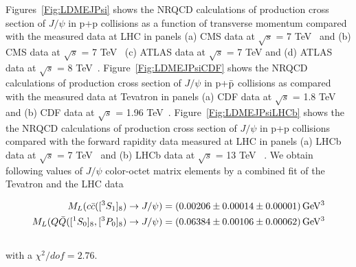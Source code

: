 \documentclass[12pt,a4paper,final]{iopart}
\newcommand{\barQ}{{\bar{Q}}}
\newcommand{\barc}{{\bar{c}}}
\newcommand{\charm}{{\rm{charm}}}
\begin{document}
 Figures~\ref{Fig:LDMEJPsi} shows the NRQCD calculations of production cross section of 
$J/\psi$ in p+p collisions as a function of transverse momentum compared with 
the measured data at LHC in panels (a) CMS data at $\sqrt{s}$ = 7 TeV~\cite{Chatrchyan:2011kc} 
and (b) CMS data at $\sqrt{s}$ = 7 TeV~\cite{Khachatryan:2015rra} (c) ATLAS data at $\sqrt{s}$ = 7 TeV 
and (d) ATLAS data at $\sqrt{s}$ = 8 TeV~\cite{Aad:2015duc}. 
   Figure~\ref{Fig:LDMEJPsiCDF} shows  the NRQCD calculations of production cross 
section of $J/\psi$ in p+{$\bar {\rm p}$}  collisions as compared with the measured data at 
Tevatron in panels 
(a) CDF data at $\sqrt{s}$ = 1.8 TeV~\cite{Abe:1997jz} and 
(b) CDF data at $\sqrt{s}$ = 1.96 TeV~\cite{Acosta:2004yw}. 
  Figure~\ref{Fig:LDMEJPsiLHCb} shows the the NRQCD calculations of production cross 
section of $J/\psi$ in p+p collisions compared with the forward rapidity data measured at LHC in panels
(a) LHCb data at $\sqrt{s}$ = 7 TeV~\cite{Aaij:2011jh} and (b) LHCb data at $\sqrt{s}$ = 13 TeV 
~\cite{Aaij:2015rla}. 
 We obtain following values of $J/\psi$ color-octet matrix elements by a combined fit of 
the Tevatron and the LHC data

\begin{equation}
\begin{split}
M_{L}(c\barc([^3S_1]_{8})\rightarrow J/\psi)&= (0.00206\pm 0.00014 \pm {\color{black}0.00001}) \,{\rm GeV^3}\\
 M_{L}(Q\barQ([^1S_0]_{8},[^3P_0]_{8})\rightarrow J/\psi)&= (0.06384\pm 0.00106 \pm {\color{black}0.00062}) \,{\rm GeV^3} \\
~\label{eq:COLDME_JPsi}
\end{split}
\end{equation}
with a {\color{black}$\chi^2/dof=2.76$}.
\end{document}
